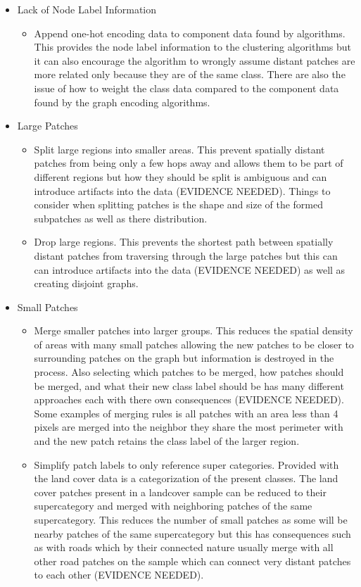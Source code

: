\documentclass[conference]{IEEEtran}
\begin{document}
	\begin{itemize}
		\item Lack of Node Label Information
		\begin{itemize}
			\item Append one-hot encoding data to component data found by algorithms. This provides the node label information to the clustering algorithms but it can also encourage the algorithm to wrongly assume distant patches are more related only because they are of the same class. There are also the issue of how to weight the class data compared to the component data found by the graph encoding algorithms.
		\end{itemize}		
		
		
		\item Large Patches
		\begin{itemize}
			\item Split large regions into smaller areas. This prevent spatially distant patches from being only a few hops away and allows them to be part of different regions but how they should be split is ambiguous and can introduce artifacts into the data (EVIDENCE NEEDED). Things to consider when splitting patches is the shape and size of the formed subpatches as well as there distribution.
			\item Drop large regions. This prevents the shortest path between spatially distant patches from traversing through the large patches but this can can introduce artifacts into the data (EVIDENCE NEEDED) as well as creating disjoint graphs.
		\end{itemize}
		\item Small Patches
		\begin{itemize}
			\item Merge smaller patches into larger groups. This reduces the spatial density of areas with many small patches allowing the new patches to be closer to surrounding patches on the graph but information is destroyed in the process. Also selecting which patches to be merged, how patches should be merged, and what their new class label should be has many different approaches each with there own consequences (EVIDENCE NEEDED). Some examples of merging rules is all patches with an area less than 4 pixels are merged into the neighbor they share the most perimeter with and the new patch retains the class label of the larger region. 
			\item Simplify patch labels to only reference super categories. Provided with the land cover data is a categorization of the present classes. The land cover patches present in a landcover sample can be reduced to their supercategory and merged with neighboring patches of the same supercategory. This reduces the number of small patches as some will be nearby patches of the same supercategory but this has consequences such as with roads which by their connected nature usually merge with all other road patches on the sample which can connect very distant patches to each other (EVIDENCE NEEDED).
		\end{itemize}
	\end{itemize}	
	
\end{document}
